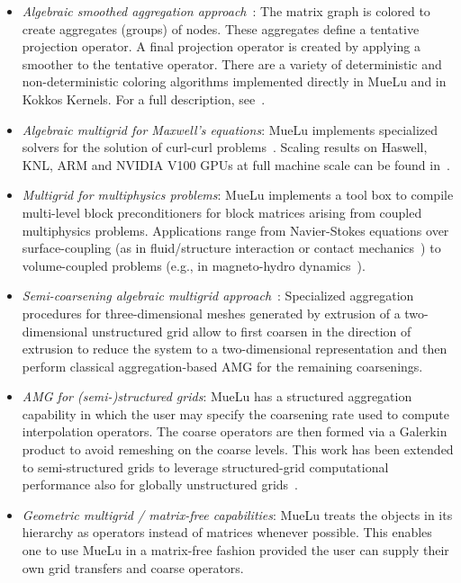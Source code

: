\begin{itemize}
\item \emph{Algebraic smoothed aggregation approach}~\cite{Vanek1996a}:
The matrix graph is colored to create aggregates (groups) of nodes.
These aggregates define a tentative projection operator.
A final projection operator is created by applying a smoother to the tentative operator.
There are a variety of deterministic and non-deterministic coloring algorithms implemented directly
in MueLu and in Kokkos Kernels.  For a full description, see~\cite{BergerVergiat2023a}.

\item \emph{Algebraic multigrid for Maxwell's equations}:
  MueLu implements specialized solvers for the solution of curl-curl problems~\cite{BochevHuEtAl2008_AlgebraicMultigridApproachBased}.
  Scaling results on Haswell, KNL, ARM and NVIDIA V100 GPUs at full machine scale can be found in~\cite{BettencourtBrownEtAl2021_EmpirePic}.

\item \emph{Multigrid for multiphysics problems}:
MueLu implements a tool box to compile multi-level block preconditioners for block matrices arising from coupled multiphysics problems.
Applications range from Navier-Stokes equations
over surface-coupling (as in fluid/structure interaction or contact mechanics~\cite{Wiesner2021a})
to volume-coupled problems (e.g., in magneto-hydro dynamics~\cite{Ohm2022a}).

\item \emph{Semi-coarsening algebraic multigrid approach}~\cite{Tuminaro2016a}:
Specialized aggregation procedures for three-dimensional meshes generated by extrusion of a two-dimensional unstructured grid
allow to first coarsen in the direction of extrusion to reduce the system to a two-dimensional representation and then perform classical aggregation-based AMG
for the remaining coarsenings.

\item \emph{AMG for (semi-)structured grids}:
MueLu has a structured aggregation capability in which the user may specify the coarsening rate used to compute interpolation operators.
The coarse operators are then formed via a Galerkin product to avoid remeshing on the coarse levels.
This work has been extended to semi-structured grids to leverage structured-grid computational performance also for globally unstructured grids~\cite{Mayr2022a}.

\item \emph{Geometric multigrid / matrix-free capabilities}:
MueLu treats the objects in its hierarchy as operators instead of matrices whenever possible.
This enables one to use MueLu in a matrix-free fashion provided the user can supply their own grid transfers and coarse operators.

\end{itemize}

